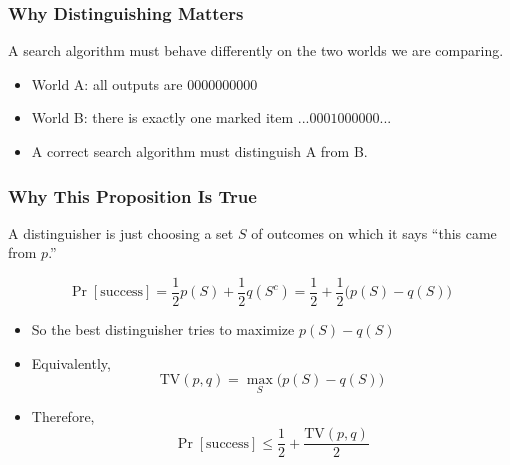 \documentclass[xcolor=table]{beamer}
\newtheorem{proposition}[theorem]{Proposition}
\theoremstyle{remark}
\theoremstyle{plain}
\begin{document}
\begin{frame}
  \frametitle{Why Distinguishing Matters}
  {\small A search algorithm must behave differently on the two worlds we are comparing.}

  \vspace{0.4cm}
  \begin{itemize}[<+->]
    \item World A: all outputs are $0000000000$
    \item World B: there is exactly one marked item $...0001000000...$
    \item A correct search algorithm must distinguish A from B.
  \end{itemize}

  \vspace{0.5cm}
\end{frame}

\begin{frame}
  \frametitle{Why This Proposition Is True}
  {\small A distinguisher is just choosing a set $S$ of outcomes on which it says ``this came from $p$.''}

  \vspace{0.4cm}
  \[
    \Pr[\text{success}]
    =
    \frac{1}{2}p(S)+\frac{1}{2}q(S^c)
    =
    \frac{1}{2}+\frac{1}{2}\bigl(p(S)-q(S)\bigr)
  \]

  {\small
  \begin{itemize}[<+->]
    \item So the best distinguisher tries to maximize $p(S)-q(S)$
    \item Equivalently,
      \[
        \mathrm{TV}(p,q)=\max_S \bigl(p(S)-q(S)\bigr)
      \]
    \item Therefore,
      \[
        \Pr[\text{success}]
        \le
        \frac{1}{2}+\frac{\mathrm{TV}(p,q)}{2}
      \]
  \end{itemize}
  }
\end{frame}
\end{document}
